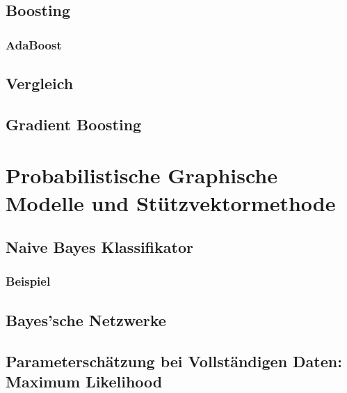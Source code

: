 	\section{Boosting} %

		\subsection{AdaBoost} %

	\section{Vergleich} %

	\section{Gradient Boosting} %

\chapter{Probabilistische Graphische Modelle und Stützvektormethode} %

	\section{Naive Bayes Klassifikator} %

		\subsection{Beispiel} %

	\section{Bayes'sche Netzwerke} %

	\section{Parameterschätzung bei Vollständigen Daten: Maximum Likelihood} %

